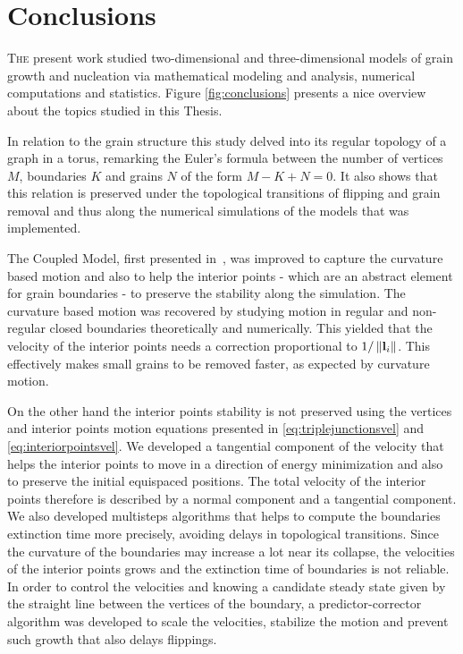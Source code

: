 \chapter{Conclusions}
\label{chap:conclusions}

\lettrine{T}{he} present work studied two-dimensional and three-dimensional models of grain growth and nucleation via mathematical modeling and analysis, numerical computations and statistics. Figure \ref{fig:conclusions} presents a nice overview about the topics studied in this Thesis.

In relation to the grain structure this study delved into its regular topology of a graph in a torus, remarking the Euler's formula between the number of vertices $M$, boundaries $K$ and grains $N$ of the form $\displaystyle M-K+N = 0$. 
It also shows that this relation is preserved under the topological transitions of flipping and grain removal and thus along the numerical simulations of the models that was implemented.

The Coupled Model, first presented in~\cite{bachelorthesisasazo}, was improved to capture the curvature based motion and also to help the interior points - which are an abstract element for grain boundaries - to preserve the stability along the simulation. 
The curvature based motion was recovered by studying motion in regular and non-regular closed boundaries theoretically and numerically. 
This yielded that the velocity of the interior points needs a correction proportional to $1/\left\lVert\mathbf{l}_i\right\rVert$. 
This effectively makes small grains to be removed faster, as expected by curvature motion. 

On the other hand the interior points stability is not preserved using the vertices and interior points motion equations presented in \eqref{eq:triplejunctionsvel} and \eqref{eq:interiorpointsvel}. We developed a tangential component of the velocity that helps the interior points to move in a direction of energy minimization and also to preserve the initial equispaced positions. 
The total velocity of the interior points therefore is described by a normal component and a tangential component.
We also developed multisteps algorithms that helps to compute the boundaries extinction time more precisely, avoiding delays in topological transitions. Since the curvature of the boundaries may increase a lot near its collapse, the velocities of the interior points grows and the extinction time of boundaries is not reliable. In order to control the velocities and knowing a candidate steady state given by the straight line between the vertices of the boundary,  a predictor-corrector algorithm was developed to scale the velocities, stabilize the motion and prevent such growth that also delays flippings.

